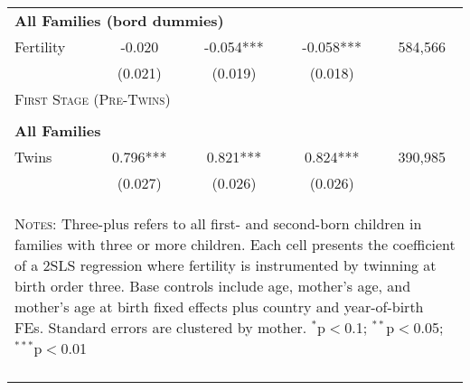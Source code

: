 \begin{table}[!htbp]
\begin{tabular}{lcccc}
\multicolumn{5}{l}{\textbf{All Families (bord dummies)}}\\ 
Fertility&-0.020&-0.054***&-0.058***&584,566\\
         &(0.021)&(0.019)&(0.018)&\\
\midrule\multicolumn{5}{l}{\textsc{First Stage (Pre-Twins)}}\\ 
&&&&\\
\multicolumn{5}{l}{\textbf{All Families}}\\ 
Twins&0.796***&0.821***&0.824***&390,985\\
         &(0.027)&(0.026)&(0.026)&\\
\hline\multicolumn{5}{p{10cm}}{\begin{footnotesize}\textsc{Notes:} Three-plus refers to all first- and second-born children in families with three or more children.  Each cell presents the coefficient of a 2SLS regression where fertility is instrumented by twinning at birth order three.  Base controls include age, mother's age, and mother's age at birth fixed effects plus country and year-of-birth FEs.  Standard errors are clustered by mother. 
$^{*}$p$<$0.1; $^{**}$p$<$0.05; $^{***}$p$<$0.01\end{footnotesize}}
\\\bottomrule\normalsize\end{tabular}\end{table} 
